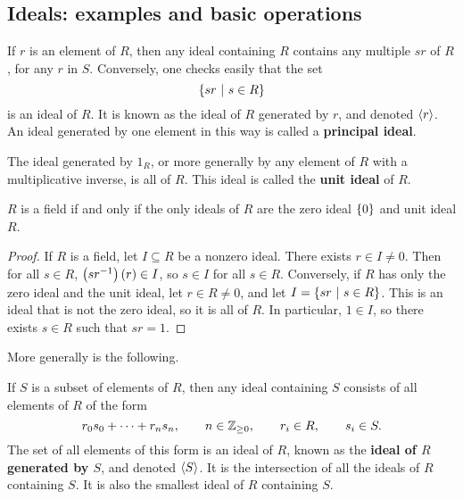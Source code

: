 \pagebreak

\subsection{Ideals: examples and basic operations}

If $ r $ is an element of $ R $, then any ideal containing $ R $ contains any multiple $ sr $ of $ R $, for any $ r $ in $ S $. Conversely, one checks easily that the set
$$ \cbr{sr \st s \in R} $$
is an ideal of $ R $. It is known as the ideal of $ R $ generated by $ r $, and denoted $ \left\langle r \right\rangle $. An ideal generated by one element in this way is called a \textbf{principal ideal}.

\begin{note*}
The ideal generated by $ 1_R $, or more generally by any element of $ R $ with a multiplicative inverse, is all of $ R $. This ideal is called the \textbf{unit ideal} of $ R $.
\end{note*}

\begin{proposition}
$ R $ is a field if and only if the only ideals of $ R $ are the zero ideal $ \cbr{0} $ and unit ideal $ R $.
\end{proposition}

\begin{proof}
If $ R $ is a field, let $ I \subseteq R $ be a nonzero ideal. There exists $ r \in I \ne 0 $. Then for all $ s \in R $, $ \br{sr^{-1}}\br{r} \in I $, so $ s \in I $ for all $ s \in R $. Conversely, if $ R $ has only the zero ideal and the unit ideal, let $ r \in R \ne 0 $, and let $ I = \cbr{sr \st s \in R} $. This is an ideal that is not the zero ideal, so it is all of $ R $. In particular, $ 1 \in I $, so there exists $ s \in R $ such that $ sr = 1 $.
\end{proof}

More generally is the following.

\begin{definition}
If $ S $ is a subset of elements of $ R $, then any ideal containing $ S $ consists of all elements of $ R $ of the form
$$ r_0s_0 + \dots + r_ns_n, \qquad n \in \mathbb{Z}_{\ge 0}, \qquad r_i \in R, \qquad s_i \in S. $$
The set of all elements of this form is an ideal of $ R $, known as the \textbf{ideal of $ R $ generated by $ S $}, and denoted $ \left\langle S \right\rangle $. It is the intersection of all the ideals of $ R $ containing $ S $. It is also the smallest ideal of $ R $ containing $ S $.
\end{definition}


